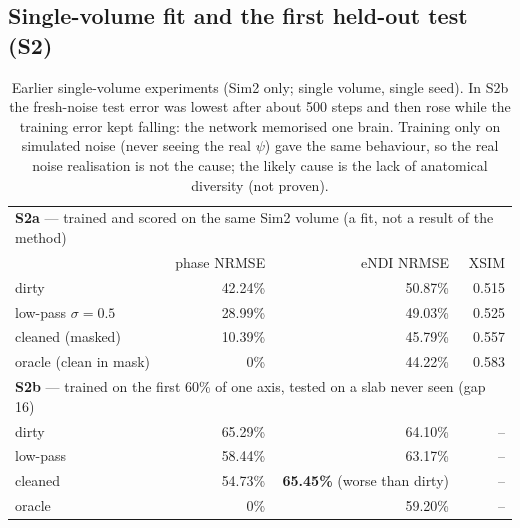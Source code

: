 \documentclass[11pt]{article}
\theoremstyle{remark}
\begin{document}
\subsection{Single-volume fit and the first held-out test (S2)}
\begin{table}[h]
\centering\small
\begin{tabular}{@{}lrrr@{}}
\toprule
\multicolumn{4}{l}{\textbf{S2a} --- trained and scored on the same Sim2 volume (a fit, not a result of the method)} \\
 & phase NRMSE & eNDI NRMSE & XSIM \\
\midrule
dirty & 42.24\% & 50.87\% & 0.515 \\
low-pass $\sigma=0.5$ & 28.99\% & 49.03\% & 0.525 \\
cleaned (masked) & 10.39\% & 45.79\% & 0.557 \\
oracle (clean in mask) & 0\% & 44.22\% & 0.583 \\
\midrule
\multicolumn{4}{l}{\textbf{S2b} --- trained on the first 60\% of one axis, tested on a slab never seen (gap 16)} \\
\midrule
dirty & 65.29\% & 64.10\% & -- \\
low-pass & 58.44\% & 63.17\% & -- \\
cleaned & 54.73\% & \textbf{65.45\%} (worse than dirty) & -- \\
oracle & 0\% & 59.20\% & -- \\
\bottomrule
\end{tabular}
\caption{Earlier single-volume experiments (Sim2 only; single volume, single seed). In S2b the fresh-noise test error was lowest after about 500 steps and then rose while the training error kept falling: the network memorised one brain. Training only on simulated noise (never seeing the real $\psi$) gave the same behaviour, so the real noise realisation is not the cause; the likely cause is the lack of anatomical diversity (not proven).}
\end{table}
\end{document}

